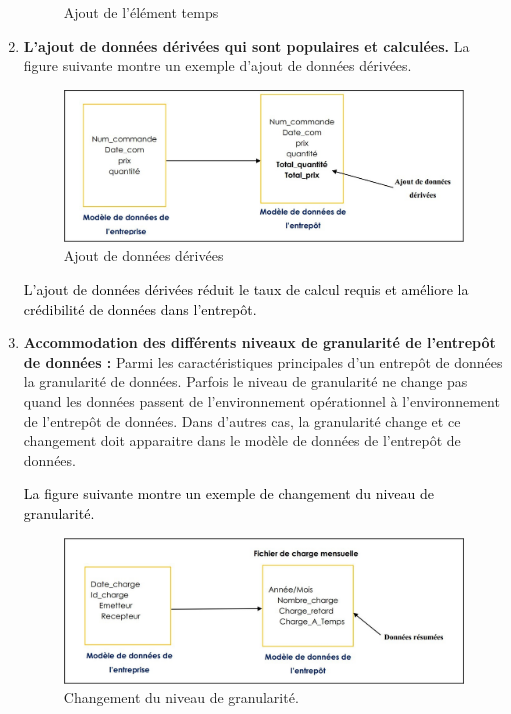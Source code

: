 \documentclass[a4paper,12pt]{report}
\begin{document}
\begin{enumerate}
\begin{figure}[H]
\caption{Ajout de l'élément temps}
\label{fig:7}

\end{figure}



\item \textbf{L’ajout de données dérivées qui sont populaires et calculées.} La figure suivante montre un exemple d’ajout de données dérivées.

\begin{figure}[H]
\begin{center}
\includegraphics[width=0.7\linewidth]{./images/8}
\end{center}

\caption{Ajout de données dérivées}
\label{fig:8}

\end{figure}


\textcolor{black}{L’ajout de données dérivées réduit le taux de calcul requis et améliore la crédibilité de données dans l’entrepôt.}


\item \textbf{Accommodation des différents niveaux de granularité de l’entrepôt de données : } Parmi les caractéristiques principales d’un entrepôt de données la granularité de données. Parfois le niveau de granularité ne change pas quand les données passent de l’environnement opérationnel à l’environnement de l’entrepôt de données. Dans d’autres cas, la granularité change et ce changement doit apparaitre dans le modèle de données de l’entrepôt de données.

\textcolor{black}{La figure suivante montre un exemple de changement du niveau de granularité.}


\begin{figure}[H]

\begin{center}
\includegraphics[width=0.7\linewidth]{./images/9}
\end{center}
\caption{Changement du niveau de granularité. \citep{inmon2000}}
\label{fig:9}


\end{figure}
\end{enumerate}
\end{document}
